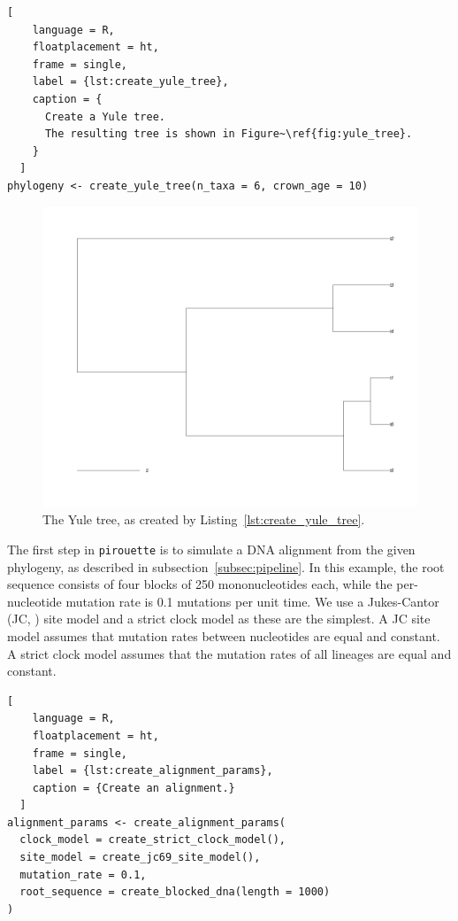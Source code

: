 \begin{lstlisting}[
    language = R,
    floatplacement = ht,
    frame = single, 
    label = {lst:create_yule_tree}, 
    caption = {
      Create a Yule tree. 
      The resulting tree is shown in Figure~\ref{fig:yule_tree}.
    }
  ]
phylogeny <- create_yule_tree(n_taxa = 6, crown_age = 10)
\end{lstlisting}

\begin{figure}[ht]
  \includegraphics[width=\textwidth]{example_1/true_tree.png}
  \caption{The Yule tree, as created by Listing~\ref{lst:create_yule_tree}.}
  \label{fig:yule_tree}
\end{figure}

The first step in \verb;pirouette; is to simulate a DNA alignment from the 
given phylogeny, as described in subsection~\ref{subsec:pipeline}.
In this example, the root sequence consists of four blocks of 250 mononucleotides each, while the per-nucleotide mutation rate is 0.1 mutations per unit time.
We use a Jukes-Cantor (JC, \cite{jukes1969evolution}) site model
and a strict clock model as these are the simplest.
A JC site model assumes that mutation rates between nucleotides are equal and constant. 
A strict clock model assumes that the mutation rates 
of all lineages are equal and constant.

\begin{lstlisting}[
    language = R,
    floatplacement = ht,
    frame = single,
    label = {lst:create_alignment_params}, 
    caption = {Create an alignment.}
  ]
alignment_params <- create_alignment_params(
  clock_model = create_strict_clock_model(),
  site_model = create_jc69_site_model(),
  mutation_rate = 0.1,
  root_sequence = create_blocked_dna(length = 1000)
)
\end{lstlisting}

